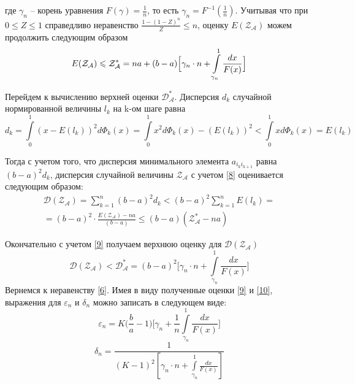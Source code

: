 \documentclass[a4paper, 14pt]{extarticle}
\numberwithin{equation}{section}
\begin{document}
где $\gamma_n$ -- корень уравнения $F(\gamma) = \frac{1}{n}$, то есть $\gamma_n = F^{-1}(\frac{1}{n})$. Учитывая что при $0 \leqslant Z \leqslant 1$ справедливо неравенство $\frac{1-(1-Z)^n}{Z} \leqslant n$, оценку $E( {\mathcal{Z_{A}}})$ можем продолжить следующим образом
\begin{equation}\label{9}
\text{$E(\text{$\mathcal{Z_{A}}$})$} \leqslant \text{$\mathcal{Z^*_{A}}$} = na+(b-a)\Big[\gamma_n \cdot n+ \int\limits_{\gamma_n}^1 \frac{dx}{F(x)} \Big]
\end{equation}

Перейдем к вычислению верхней оценки $\mathcal{D_A^{*}}$. Дисперсия $d_k$ случайной нормированной величины $l_k$ на k-ом шаге равна
\begin{equation*}
d_k=\int\limits_0^1 (x-E(l_k))^2 d \Phi_k(x) = \int\limits_0^1 x^2 d \Phi_k(x)- (E(l_k))^2 < \int\limits_0^1 x d \Phi_k(x) = E(l_k)
\end{equation*}

Тогда с учетом того, что дисперсия минимального элемента $a_{i_k i_{k+1}}$ равна $(b-a)^2 d_k$, дисперсия случайной величины ${\mathcal{Z_{A}}}$ с учетом \eqref{8} оценивается следующим образом:
\begin{equation*}
\begin{aligned}
\mathcal{D(\mathcal{Z_{A}})} = \sum_{k=1}^n (b-a)^2 d_k < (b-a)^2 \sum_{k=1}^n E(l_k) =\\
= (b-a)^2 \cdot \frac{E(\mathcal{Z_{A}})-na}{(b-a)} \leqslant (b-a)(\mathcal{Z_{A}^*}-na)
\end{aligned}
\end{equation*}

Окончательно с учетом \eqref{9} получаем верхнюю оценку для $\mathcal{D(\mathcal{Z_{A}})}$
\begin{equation}\label{10}
\mathcal{D(\mathcal{Z_{A}})} < \mathcal{D_{A}^*} = (b-a)^2 \Big[\gamma_n\cdot n+\int\limits_{\gamma_n}^1 \frac{dx}{F(x)} \Big]
\end{equation}
Вернемся к неравенству \eqref{6}. Имея в виду полученные оценки \eqref{9} и \eqref{10}, выражения для $\varepsilon_n$ и $\delta_n$ можно записать в следующем виде: 
\begin{equation*}
\varepsilon_n = K \Big(\frac{b}{a}-1 \Big) \Big[\gamma_n + \frac{1}{n} \int\limits_{\gamma_n}^1 \frac{dx}{F(x)} \Big]
\end{equation*}
\begin{equation*}
\delta_n = \frac{1}{(K-1)^2 [\gamma_n \cdot n + \int\limits_{\gamma_n}^1 \frac{dx}{F(x)}]}
\end{equation*}
\end{document}

